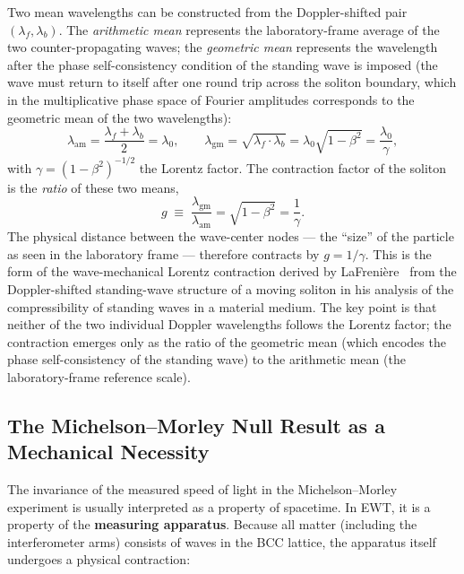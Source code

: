\documentclass[10pt,a4paper]{article}
\begin{document}
Two mean wavelengths can be constructed from the Doppler-shifted pair
$(\lambda_f, \lambda_b)$. The \emph{arithmetic mean} represents the
laboratory-frame average of the two counter-propagating waves; the
\emph{geometric mean} represents the wavelength after the phase
self-consistency condition of the standing wave is imposed (the wave
must return to itself after one round trip across the soliton boundary,
which in the multiplicative phase space of Fourier amplitudes
corresponds to the geometric mean of the two wavelengths):
\begin{equation}
	\lambda_{\mathrm{am}}
	= \frac{\lambda_f + \lambda_b}{2}
	= \lambda_0,
	\qquad
	\lambda_{\mathrm{gm}}
	= \sqrt{\lambda_f \cdot \lambda_b}
	= \lambda_0\sqrt{1-\beta^2}
	= \frac{\lambda_0}{\gamma},
	\label{eq:doppler_means}
\end{equation}
with $\gamma = (1-\beta^2)^{-1/2}$ the Lorentz factor. The contraction
factor of the soliton is the \emph{ratio} of these two means,
\begin{equation}
	g \;\equiv\; \frac{\lambda_{\mathrm{gm}}}{\lambda_{\mathrm{am}}}
	= \sqrt{1-\beta^2}
	= \frac{1}{\gamma}.
	\label{eq:lorentz_ratio}
\end{equation}
The physical distance between the wave-center nodes --- the ``size'' of
the particle as seen in the laboratory frame --- therefore contracts by
$g = 1/\gamma$. This is the form of the wave-mechanical Lorentz
contraction derived by LaFrenière~\cite{LaFreniere2000} from the
Doppler-shifted standing-wave structure of a moving soliton in his analysis
of the compressibility of standing waves in a material medium. The key
point is that neither of the two individual Doppler wavelengths follows
the Lorentz factor; the contraction emerges only as the ratio of the
geometric mean (which encodes the phase self-consistency of the standing
wave) to the arithmetic mean (the laboratory-frame reference scale).

\subsection{The Michelson–Morley Null Result as a Mechanical Necessity}

The invariance of the measured speed of light in the Michelson–Morley
experiment is usually interpreted as a property of spacetime.  In EWT, it is
a property of the \textbf{measuring apparatus}.  Because all matter
(including the interferometer arms) consists of waves in the BCC lattice,
the apparatus itself undergoes a physical contraction:
\end{document}
